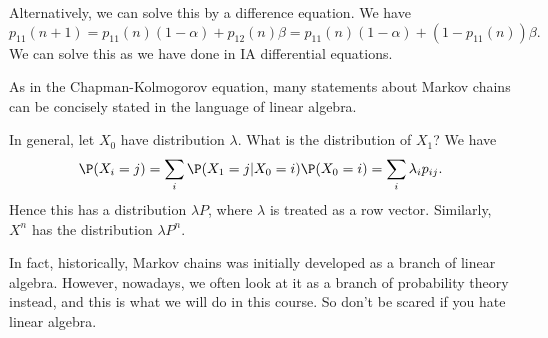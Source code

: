 \documentclass[a4paper]{article}
\begin{document}
\begin{eg}
  Alternatively, we can solve this by a difference equation. We have
  \[
    p_{11}(n + 1) = p_{11}(n)(1 - \alpha) + p_{12}(n)\beta = p_{11}(n)(1 - \alpha) + (1 - p_{11}(n))\beta.
  \]
  We can solve this as we have done in IA differential equations.
\end{eg}
As in the Chapman-Kolmogorov equation, many statements about Markov chains can be concisely stated in the language of linear algebra.

In general, let $X_0$ have distribution $\lambda$. What is the distribution of $X_1$? We have
\[
  \P(X_i = j) = \sum_i \P(X_1 = j| X_0 = i)\P(X_0 = i) = \sum_i \lambda_i p_{ij}.
\]
Hence this has a distribution $\lambda P$, where $\lambda$ is treated as a row vector. Similarly, $X^n$ has the distribution $\lambda P^n$.

In fact, historically, Markov chains was initially developed as a branch of linear algebra. However, nowadays, we often look at it as a branch of probability theory instead, and this is what we will do in this course. So don't be scared if you hate linear algebra.
\end{document}
